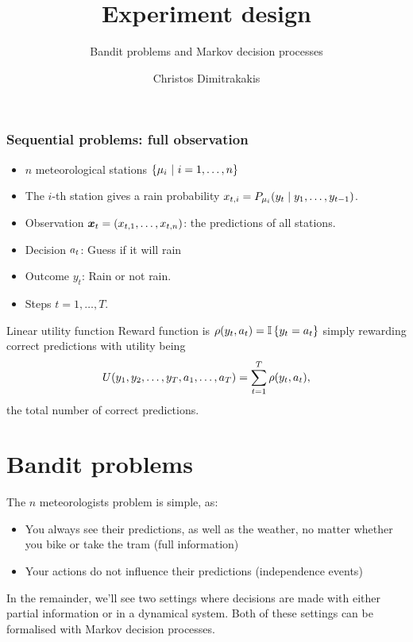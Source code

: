 \documentclass[9pt]{beamer}
\title{Experiment design}
\subtitle{Bandit problems and Markov decision processes}
\author{Christos Dimitrakakis}
\institute{UiO}
\begin{document}
\begin{frame}
  \titlepage
\end{frame}

\begin{frame}
  \tableofcontents
\end{frame}



\begin{frame}
  \frametitle{Sequential problems: full observation}
  \begin{example}
    \begin{itemize}
    \item $n$ meteorological stations $\left\{\mu_i ~\middle|~ i=1, \ldots,n\right\}$
    \item The $i$-th station gives a rain probability $x_{t,i} = P_{\mu_i}(y_t \mid y_1, \ldots, y_{t-1})$.
    \end{itemize}
  \end{example}
  \begin{itemize}
  \item Observation $\bx_t = (x_{t,1}, \ldots, x_{t,n})$: the predictions of all stations.
  \item Decision $a_t$: Guess if it will rain
  \item Outcome $y_t$: Rain or not rain.
  \item Steps $t = 1, \ldots, T$.
  \end{itemize}

  \begin{block}{Linear utility function}
    Reward function is $\rho(y_t, a_t) = \mathop{\mbox{\ensuremath{\mathbb{I}}}}\left\{y_t = a_t\right\}$ simply rewarding correct predictions with utility being
    \[
      U(y_1, y_2, \ldots, y_T, a_1, \ldots, a_T)
      = 
      \sum_{t=1}^T \rho(y_t, a_t),
    \]
    the total number of correct predictions.
  \end{block}

\end{frame}


\section{Bandit problems}
\label{sec:exp-design-bandit}

\begin{frame}

  The $n$ meteorologists problem is simple, as:

  \begin{itemize}
  \item You always see their predictions, as well as the weather, no matter whether you bike or take the tram (full information)
  \item Your actions do not influence their predictions (independence events)
  \end{itemize}
  
  In the remainder, we'll see two settings where decisions are made with either \alert{partial information} or in a \alert{dynamical system}. Both of these settings can be formalised with Markov decision processes.

\end{frame}
\end{document}
